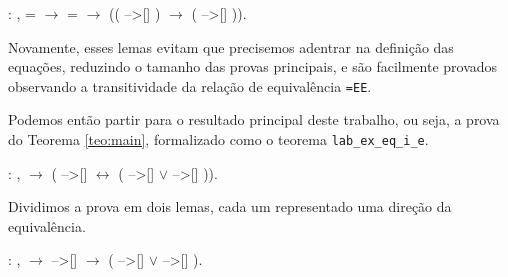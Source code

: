 \smallskip

 :
\coqdockw{\ensuremath{\forall}}   
,  = 
\ensuremath{\rightarrow}  = 
\ensuremath{\rightarrow} (( -->[] )
\ensuremath{\rightarrow} ( -->[]
)).\coqdoceol
\bigskip


Novamente, esses lemas evitam que precisemos adentrar na definição das
equações, reduzindo o tamanho das provas principais, e são facilmente provados
observando a transitividade da relação de equivalência \texttt{=EE}.

\bigskip

Podemos então partir para o resultado principal deste trabalho, ou seja, a prova
do Teorema \ref{teo:main}, formalizado como o teorema
\texttt{lab\_ex\_eq\_i\_e}.

\bigskip

 :
\coqdockw{\ensuremath{\forall}}  ,
  \ensuremath{\rightarrow} (
-->[]  \ensuremath{\leftrightarrow} (
-->[]  \ensuremath{\lor} 
-->[] )).\coqdoceol

\bigskip

Dividimos a prova em dois lemas, cada um representado uma direção da
equivalência.

\bigskip

\coqdocnoindent {} :
\coqdockw{\ensuremath{\forall}}  ,
  \ensuremath{\rightarrow} 
-->[]  \ensuremath{\rightarrow} (
-->[]  \ensuremath{\lor} 
-->[] ).\coqdoceol

